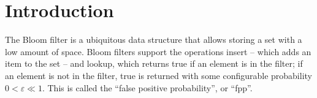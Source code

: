 \documentclass[letterpaper,twocolumn,10pt]{article}
\newcommand{\TCF}{SCF}
\newcommand{\MTCF}{MSCF}
\newcommand{\TCF}{TCF}
\newcommand{\MTCF}{MTCF}
\begin{document}



\section{Introduction}






The Bloom filter is a ubiquitous data structure that allows storing a set with a low amount of space.
Bloom filters support the operations insert -- which adds an item to the set -- and lookup, which returns true if an element is in the filter; if an element is not in the filter, true is returned with some configurable probability $0 < \varepsilon \ll 1$.
This is called the ``false positive probability'', or ``fpp''.
\end{document}
